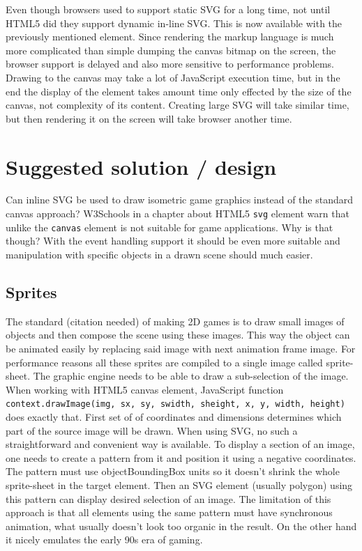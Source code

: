 \documentclass[11pt,oneside, final]{fithesis2}
\begin{document}
Even though browsers used to support static SVG for a long time, not until HTML5 did they support dynamic in-line SVG\cite{w3_html5}. This is now available with the previously mentioned element. Since rendering the markup language is much more complicated than simple dumping the canvas bitmap on the screen, the browser support is delayed and also more sensitive to performance problems. Drawing to the canvas may take a lot of JavaScript execution time, but in the end the display of the element takes amount time only effected by the size of the canvas, not complexity of its content. Creating large SVG will take similar time, but then rendering it on the screen will take browser another time.

\chapter{Suggested solution / design}
\label{solution}
Can inline SVG be used to draw isometric game graphics instead of the standard canvas approach? W3Schools in a chapter about HTML5 \texttt{svg} element warn that unlike the \texttt{canvas} element is not suitable for game applications\cite{html5svg}. Why is that though? With the event handling support it should be even more suitable and manipulation with specific objects in a drawn scene should much easier.

\section{Sprites}
The standard (citation needed) of making 2D games is to draw small images of objects and then compose the scene using these images. This way the object can be animated easily by replacing said image with next animation frame image. For performance reasons all these sprites are compiled to a single image called sprite-sheet. The graphic engine needs to be able to draw a sub-selection of the image. When working with HTML5 canvas element, JavaScript function \texttt{context.drawImage(img, sx, sy, swidth, sheight, x, y, width, height)} does exactly that. First set of of coordinates and dimensions determines which part of the source image will be drawn. When using SVG, no such a straightforward and convenient way is available. To display a section of an image, one needs to create a pattern from it and position it using a negative coordinates. The pattern must use objectBoundingBox units so it doesn't shrink the whole sprite-sheet in the target element. Then an SVG element (usually polygon) using this pattern can display desired selection of an image.
The limitation of this approach is that all elements using the same pattern must have synchronous animation, what usually doesn't look too organic in the result. On the other hand it nicely emulates the early 90s era of gaming.
\end{document}
